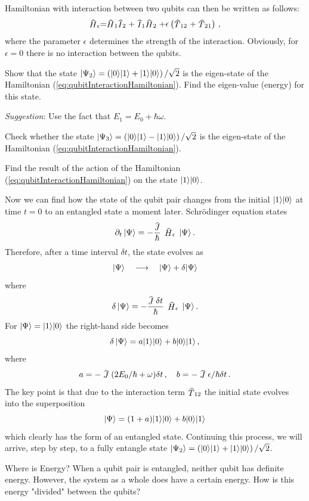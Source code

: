Hamiltonian with interaction between two qubits can then be written as follows:
\begin{equation}
	\op{H}_\epsilon=\op{H}_1\op{I}_2+\op{I}_1\op{H}_2+\epsilon\left(\op{T}_{12}+\op{T}_{21}\right)\,,
	\label{eq:qubitInteractionHamiltonian}
\end{equation}
where the parameter $\epsilon$ determines the strength of the interaction. Obviously, for $\epsilon=0$ there is no interaction between the qubits.

\begin{exercise}
	Show that the state $|{\Psi_2}\rangle = \left(|{0}\rangle|{1}\rangle + |{1}\rangle|{0}\rangle\right )/\sqrt{2}$ is the eigen-state of  the Hamiltonian (\ref{eq:qubitInteractionHamiltonian}). Find the eigen-value (energy) for this state.
	
	{\it Suggestion}: Use the fact that $E_1=E_0+\hbar\omega$. 
\end{exercise}
\begin{exercise}
	Check whether the state $|{\Psi_3}\rangle = \left(|{0}\rangle|{1}\rangle - |{1}\rangle|{0}\rangle\right )/\sqrt{2}$ is the eigen-state of the Hamiltonian (\ref{eq:qubitInteractionHamiltonian}). 
\end{exercise}
\begin{exercise}
	Find the result of the action of the Hamiltonian (\ref{eq:qubitInteractionHamiltonian}) on the state $|{1}\rangle|{0}\rangle$.
\end{exercise}
Now we can find how the state of the qubit pair changes from the initial $|{1}\rangle|{0}\rangle$ at time $t=0$ to an entangled state a moment later. Schr\"{o}dinger equation states
\[
\partial_t\,\ket{\Psi}=-\frac{\op{J}}{\hbar}\,\op{H}_\epsilon\,\ket{\Psi}\,.
\]
Therefore, after a time interval $\delta t$, the state evolves as
\[
|{\Psi}\rangle\quad\longrightarrow\quad |{\Psi}\rangle+\delta|{\Psi}\rangle
\]
where 
\[
\delta\,\ket{\Psi}=-\frac{\op{J}\delta t}{\hbar}\,\op{H}_\epsilon\,\ket{\Psi}\,.
\]
For $|{\Psi}\rangle=|{1}\rangle|{0}\rangle$ the right-hand side becomes
\[
\delta\,|{\Psi}\rangle=a|{1}\rangle|{0}\rangle+b|{0}\rangle|{1}\rangle\,,
\]
where 
\[
a = -\op{J}(2E_0/\hbar+\omega)\delta t\,,\quad b = -\op{J}\epsilon/\hbar\delta t\,.
\]
The key point is that due to the interaction term $\op{T}_{12}$ the initial state evolves into the superposition
\[
|{\Psi}\rangle=(1+a)|{1}\rangle|{0}\rangle+b|{0}\rangle|{1}\rangle
\]
which clearly has the form of an entangled state. Continuing this process, we will arrive, step by step, to a fully entangle state $|{\Psi_2}\rangle = \left(|{0}\rangle|{1}\rangle + |{1}\rangle|{0}\rangle\right )/\sqrt{2}$.

\begin{mybio}{Where is Energy?}
	When a qubit pair is entangled, neither qubit has definite energy. However, the system as a whole does have a certain energy. How is this energy "divided" between the qubits?
\end{mybio}




